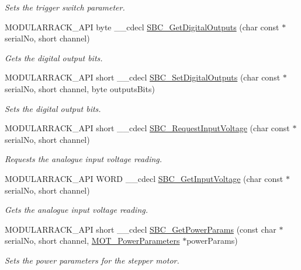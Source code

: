 \begin{DoxyCompactItemize}
\begin{DoxyCompactList}\small\item\em Sets the trigger switch parameter. \end{DoxyCompactList}\item 
M\+O\+D\+U\+L\+A\+R\+R\+A\+C\+K\+\_\+\+A\+PI byte \+\_\+\+\_\+cdecl \hyperlink{group___modular_stepper_ga87ad6dfa4488d5b1ae521b682ce31794}{S\+B\+C\+\_\+\+Get\+Digital\+Outputs} (char const $\ast$serial\+No, short channel)
\begin{DoxyCompactList}\small\item\em Gets the digital output bits. \end{DoxyCompactList}\item 
M\+O\+D\+U\+L\+A\+R\+R\+A\+C\+K\+\_\+\+A\+PI short \+\_\+\+\_\+cdecl \hyperlink{group___modular_stepper_ga2f54c2cf2754b6de524a1cbf4c288026}{S\+B\+C\+\_\+\+Set\+Digital\+Outputs} (char const $\ast$serial\+No, short channel, byte outputs\+Bits)
\begin{DoxyCompactList}\small\item\em Sets the digital output bits. \end{DoxyCompactList}\item 
M\+O\+D\+U\+L\+A\+R\+R\+A\+C\+K\+\_\+\+A\+PI short \+\_\+\+\_\+cdecl \hyperlink{group___modular_stepper_ga0dd05c53f68ab3b534afd5004112802b}{S\+B\+C\+\_\+\+Request\+Input\+Voltage} (char const $\ast$serial\+No, short channel)
\begin{DoxyCompactList}\small\item\em Requests the analogue input voltage reading. \end{DoxyCompactList}\item 
M\+O\+D\+U\+L\+A\+R\+R\+A\+C\+K\+\_\+\+A\+PI W\+O\+RD \+\_\+\+\_\+cdecl \hyperlink{group___modular_stepper_ga185d3860b3cbb4722d298b3caae937fd}{S\+B\+C\+\_\+\+Get\+Input\+Voltage} (char const $\ast$serial\+No, short channel)
\begin{DoxyCompactList}\small\item\em Gets the analogue input voltage reading. \end{DoxyCompactList}\item 
M\+O\+D\+U\+L\+A\+R\+R\+A\+C\+K\+\_\+\+A\+PI short \+\_\+\+\_\+cdecl \hyperlink{group___modular_stepper_gaf43fb8892d6cfe60dc53788735b37403}{S\+B\+C\+\_\+\+Get\+Power\+Params} (const char $\ast$serial\+No, short channel, \hyperlink{struct_m_o_t___power_parameters}{M\+O\+T\+\_\+\+Power\+Parameters} $\ast$power\+Params)
\begin{DoxyCompactList}\small\item\em Sets the power parameters for the stepper motor. \end{DoxyCompactList}\item 

\end{DoxyCompactItemize}
